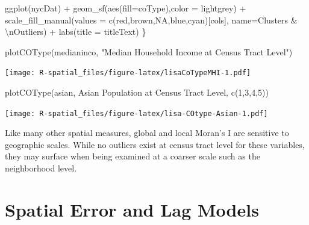 \documentclass[
  11pt,
]{book}
\newenvironment{Shaded}{\begin{snugshade}}{\end{snugshade}}
\newcommand{\AttributeTok}[1]{\textcolor[rgb]{0.77,0.63,0.00}{#1}}
\newcommand{\DecValTok}[1]{\textcolor[rgb]{0.00,0.00,0.81}{#1}}
\newcommand{\FunctionTok}[1]{\textcolor[rgb]{0.00,0.00,0.00}{#1}}
\newcommand{\NormalTok}[1]{#1}
\newcommand{\SpecialCharTok}[1]{\textcolor[rgb]{0.00,0.00,0.00}{#1}}
\newcommand{\StringTok}[1]{\textcolor[rgb]{0.31,0.60,0.02}{#1}}
\begin{document}
\begin{Shaded}
\begin{Highlighting}[]
  \FunctionTok{ggplot}\NormalTok{(nycDat) }\SpecialCharTok{+}
    \FunctionTok{geom\_sf}\NormalTok{(}\FunctionTok{aes}\NormalTok{(}\AttributeTok{fill=}\NormalTok{coType),}\AttributeTok{color =} \StringTok{\textquotesingle{}lightgrey\textquotesingle{}}\NormalTok{) }\SpecialCharTok{+}
    \FunctionTok{scale\_fill\_manual}\NormalTok{(}\AttributeTok{values =} \FunctionTok{c}\NormalTok{(}\StringTok{\textquotesingle{}red\textquotesingle{}}\NormalTok{,}\StringTok{\textquotesingle{}brown\textquotesingle{}}\NormalTok{,}\StringTok{\textquotesingle{}NA\textquotesingle{}}\NormalTok{,}\StringTok{\textquotesingle{}blue\textquotesingle{}}\NormalTok{,}\StringTok{\textquotesingle{}cyan\textquotesingle{}}\NormalTok{)[cols], }\AttributeTok{name=}\StringTok{\textquotesingle{}Clusters \& }\SpecialCharTok{\textbackslash{}n}\StringTok{Outliers\textquotesingle{}}\NormalTok{) }\SpecialCharTok{+}
    \FunctionTok{labs}\NormalTok{(}\AttributeTok{title =}\NormalTok{ titleText)}
\NormalTok{\}}

\FunctionTok{plotCOType}\NormalTok{(}\StringTok{\textquotesingle{}medianinco\textquotesingle{}}\NormalTok{, }\StringTok{"Median Household Income at Census Tract Level"}\NormalTok{)}
\end{Highlighting}
\end{Shaded}

\texttt{[image: R-spatial\_files/figure-latex/lisaCoTypeMHI-1.pdf]}

\begin{Shaded}
\begin{Highlighting}[]
\FunctionTok{plotCOType}\NormalTok{(}\StringTok{\textquotesingle{}asian\textquotesingle{}}\NormalTok{, }\StringTok{\textquotesingle{}Asian Population at Census Tract Level\textquotesingle{}}\NormalTok{, }\FunctionTok{c}\NormalTok{(}\DecValTok{1}\NormalTok{,}\DecValTok{3}\NormalTok{,}\DecValTok{4}\NormalTok{,}\DecValTok{5}\NormalTok{))}
\end{Highlighting}
\end{Shaded}

\texttt{[image: R-spatial\_files/figure-latex/lisa-COtype-Asian-1.pdf]}

Like many other spatial measures, global and local Moran's I are sensitive to geographic scales. While no outliers exist at census tract level for these variables, they may surface when being examined at a coarser scale such as the neighborhood level.

\hypertarget{spatial-error-and-lag-models}{%
\section{Spatial Error and Lag Models}\label{spatial-error-and-lag-models}}
\end{document}
